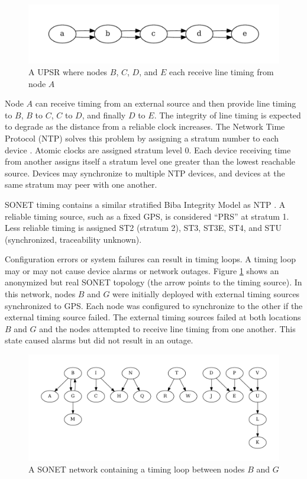 \documentclass{book}
\begin{document}
\begin{figure}[H]
\centering
\includegraphics[width=\columnwidth]{figures/abcde}
\caption{A UPSR where nodes $B$, $C$, $D$, and $E$ each receive line timing from node $A$}
\end{figure}

Node $A$ can receive timing from an external source and then provide line timing to $B$, $B$ to $C$, $C$ to $D$, and finally $D$ to $E$. The integrity of line timing is expected to degrade as the distance from a reliable clock increases. The Network Time Protocol (NTP) solves this problem by assigning a stratum number to each device \cite{rfc1305}. Atomic clocks are assigned stratum level 0. Each device receiving time from another assigns itself a stratum level one greater than the lowest reachable source. Devices may synchronize to multiple NTP devices, and devices at the same stratum may peer with one another.

SONET timing contains a similar stratified Biba Integrity Model as NTP \cite{biba1977integrity}. A reliable timing source, such as a fixed GPS, is considered ``PRS'' at stratum 1. Less reliable timing is assigned ST2 (stratum 2), ST3, ST3E, ST4, and STU (synchronized, traceability unknown).

Configuration errors or system failures can result in timing loops. A timing loop may or may not cause device alarms or network outages. Figure \ref{loop} shows an anonymized but real SONET topology (the arrow points to the timing source). In this network, nodes $B$ and $G$ were initially deployed with external timing sources synchronized to GPS. Each node was configured to synchronize to the other if the external timing source failed. The external timing sources failed at both locations $B$ and $G$ and the nodes attempted to receive line timing from one another. This state caused alarms but did not result in an outage. 

\begin{figure}
\centering
\includegraphics[width=\columnwidth]{figures/loop}
\caption{A SONET network containing a timing loop between nodes $B$ and $G$}
\label{loop}
\end{figure}
\end{document}
